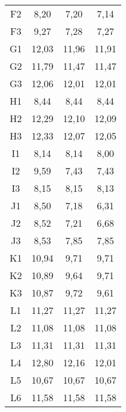 \begin{center}
\begin{longtable}{cccc}
    F2    & 8,20  & 7,20  & 7,14 \\
    F3    & 9,27  & 7,28  & 7,27 \\
    G1    & 12,03 & 11,96 & 11,91 \\
    G2    & 11,79 & 11,47 & 11,47 \\
    G3    & 12,06 & 12,01 & 12,01 \\
    H1    & 8,44  & 8,44  & 8,44 \\
    H2    & 12,29 & 12,10 & 12,09 \\
    H3    & 12,33 & 12,07 & 12,05 \\
    I1    & 8,14  & 8,14  & 8,00 \\
    I2    & 9,59  & 7,43  & 7,43 \\
    I3    & 8,15  & 8,15  & 8,13 \\
    J1    & 8,50  & 7,18  & 6,31 \\
    J2    & 8,52  & 7,21  & 6,68 \\
    J3    & 8,53  & 7,85  & 7,85 \\
    K1    & 10,94 & 9,71  & 9,71 \\
    K2    & 10,89 & 9,64  & 9,71 \\
    K3    & 10,87 & 9,72  & 9,61 \\
    L1    & 11,27 & 11,27 & 11,27 \\
    L2    & 11,08 & 11,08 & 11,08 \\
    L3    & 11,31 & 11,31 & 11,31 \\
    L4    & 12,80 & 12,16 & 12,01 \\
    L5    & 10,67 & 10,67 & 10,67 \\
    L6    & 11,58 & 11,58 & 11,58 \\

\end{longtable}
\end{center}


